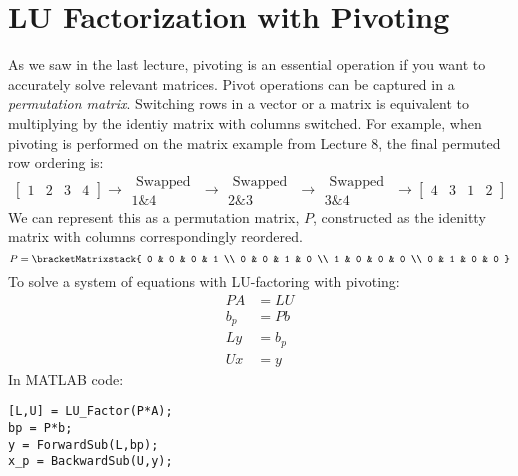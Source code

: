\section{LU Factorization with Pivoting}
As we saw in the last lecture, pivoting is an essential operation if you want to accurately solve relevant matrices. Pivot operations can be captured in a \emph{permutation matrix}.  Switching rows in a vector or a matrix is equivalent to multiplying by the identiy matrix with columns switched.  For example, when pivoting is performed on the matrix example from Lecture 8, the final permuted row ordering is: 
\begin{equation*}
\left[ \begin{matrix} 1 & 2 & 3 & 4 \end{matrix} \right] \rightarrow \substack{\text{ Swapped } \\ \text{1\&4}} \rightarrow \substack{\text{ Swapped } \\ \text{2\&3}} \rightarrow \substack{\text{ Swapped } \\ \text{3\&4}} \rightarrow \left[\begin{matrix}4 & 3 & 1 & 2 \end{matrix} \right]
\end{equation*}
We can represent this as a permutation matrix, $P$, constructed as the idenitty matrix with columns correspondingly reordered.
\begin{equation*}
P = 
\bracketMatrixstack{
0 & 0 & 0 & 1 \\
0 & 0 & 1 & 0 \\
1 & 0 & 0 & 0 \\
0 & 1 & 0 & 0
}
\end{equation*}
To solve a system of equations with LU-factoring with pivoting:
\begin{align*}
PA &= LU \\
b_p &= Pb \\
Ly &= b_p \\
Ux &= y
\end{align*}
In MATLAB code:
\begin{lstlisting}[style=myMatlab]
[L,U] = LU_Factor(P*A);
bp = P*b;
y = ForwardSub(L,bp);
x_p = BackwardSub(U,y);
\end{lstlisting}
